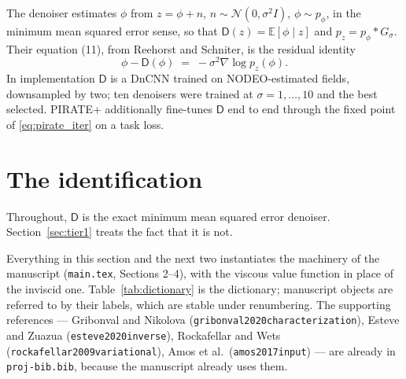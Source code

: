 \documentclass[11pt]{article}
\theoremstyle{definition}
\newcommand{\E}{\mathbb{E}}
\newcommand{\D}{\mathsf{D}}
\newcommand{\code}[1]{\texttt{#1}}
\begin{document}
The denoiser estimates $\phi$ from $z = \phi + n$, $n\sim\mathcal{N}(0,\sigma^2 I)$, $\phi \sim p_\phi$, in the minimum mean squared error sense, so that $\D(z) = \E[\phi\mid z]$ and $p_z = p_\phi * G_\sigma$. Their equation (11), from Reehorst and Schniter, is the residual identity
\begin{equation}
\label{eq:tweedie}
\phi - \D(\phi) \;=\; -\sigma^2 \nabla \log p_z(\phi).
\end{equation}
In implementation $\D$ is a DnCNN trained on NODEO-estimated fields, downsampled by two; ten denoisers were trained at $\sigma = 1,\dots,10$ and the best selected. PIRATE+ additionally fine-tunes $\D$ end to end through the fixed point of \eqref{eq:pirate_iter} on a task loss.

\section{The identification}
\label{sec:identification}

Throughout, $\D$ is the exact minimum mean squared error denoiser. Section~\ref{sec:tier1} treats the fact that it is not.

Everything in this section and the next two instantiates the machinery of the manuscript (\code{main.tex}, Sections 2--4), with the viscous value function in place of the inviscid one. Table~\ref{tab:dictionary} is the dictionary; manuscript objects are referred to by their labels, which are stable under renumbering. The supporting references — Gribonval and Nikolova (\code{gribonval2020characterization}), Esteve and Zuazua (\code{esteve2020inverse}), Rockafellar and Wets (\code{rockafellar2009variational}), Amos et al.\ (\code{amos2017input}) — are already in \code{proj-bib.bib}, because the manuscript already uses them.
\end{document}
